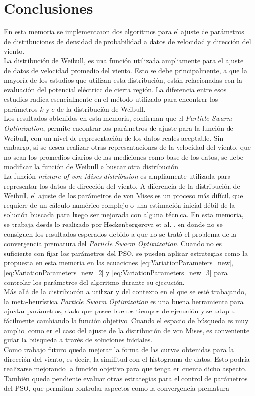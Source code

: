 \chapter{Conclusiones}
En esta memoria se implementaron dos algoritmos para el ajuste de parámetros de distribuciones de densidad de probabilidad a datos de velocidad y dirección del viento.\\
La distribución de Weibull, es una función utilizada ampliamente para el ajuste de datos de velocidad promedio del viento. Esto se debe principalmente, a que la mayoría de los estudios que utilizan esta distribución, están relacionadas con la evaluación del potencial eléctrico de cierta región. La diferencia entre esos estudios radica esencialmente en el método utilizado para encontrar los parámetros $k$ y $c$ de la distribución de Weibull.\\
Los resultados obtenidos en esta memoria, confirman que el \emph{Particle Swarm Optimization}, permite encontrar los parámetros de ajuste para la función de Weibull, con un nivel de representación de los datos reales aceptable. Sin embargo, si se desea realizar otras representaciones de la velocidad del viento, que no sean los promedios diarios de las mediciones como base de los datos, se debe modificar la función de Weibull o buscar otra distribución.\\
La función \emph{mixture of von Mises distribution} es ampliamente utilizada para representar los datos de dirección del viento. A diferencia de la distribución de Weibull, el ajuste de los parámetros de von Mises es un proceso más difícil, que requiere de un cálculo numérico complejo o una estimación inicial débil de la solución buscada para luego ser mejorada con alguna técnica. En esta memoria, se trabaja desde lo realizado por Heckenbergerova et al. \cite{Heckenbergerova15}, en donde no se consiguen los resultados esperados debido a que no se trató el problema de la convergencia prematura del \emph{Particle Swarm Optimization}. Cuando no es suficiente con fijar los parámetros del PSO, se pueden aplicar estrategias como la propuesta en esta memoria en las ecuaciones \ref{eq:VariationParameters_new}, \ref{eq:VariationParameters_new_2} y \ref{eq:VariationParameters_new_3} para controlar los parámetros del algoritmo durante su ejecución.\\
Más allá de la distribución a utilizar y del contexto en el que se esté trabajando, la meta-heurística \emph{Particle Swarm Optimization} es una buena herramienta para ajustar parámetros, dado que posee buenos tiempos de ejecución y se adapta fácilmente cambiando la función objetivo. Cuando el espacio de búsqueda es muy amplio, como en el caso del ajuste de la distribución de von Mises, es conveniente guiar la búsqueda a través de soluciones iniciales.\\
Como trabajo futuro queda mejorar la forma de las curvas obtenidas para la dirección del viento, es decir, la similitud con el histograma de datos. Esto podría realizarse mejorando la función objetivo para que tenga en cuenta dicho aspecto. También queda pendiente evaluar otras estrategias para el control de parámetros del PSO, que permitan controlar aspectos como la convergencia prematura.\\
